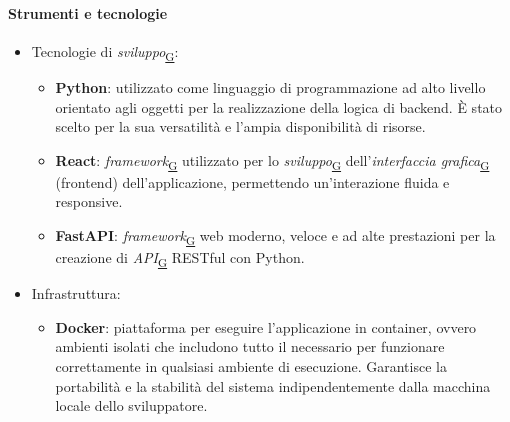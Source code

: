 \documentclass[a4paper,12pt]{article}
\begin{document}
{{{            \paragraph{Strumenti e tecnologie}\hfill{
                \begin{itemize}
                    \item Tecnologie di \textit{sviluppo}\textsubscript{\href{https://atlasteam9.github.io/Atlas/glossario.html\#Sviluppo}{G}}:
                    \begin{itemize}
                        \item \textbf{Python}: utilizzato come linguaggio di programmazione ad alto livello orientato agli oggetti per la realizzazione della logica di backend. È stato scelto per la sua versatilità e l'ampia disponibilità di risorse.
                        \item \textbf{React}: \textit{framework}\textsubscript{\href{https://atlasteam9.github.io/Atlas/glossario.html\#Framework}{G}} utilizzato per lo \textit{sviluppo}\textsubscript{\href{https://atlasteam9.github.io/Atlas/glossario.html\#Sviluppo}{G}} dell'\textit{interfaccia grafica}\textsubscript{\href{https://atlasteam9.github.io/Atlas/glossario.html\#Interfacciagrafica}{G}} (frontend) dell'applicazione, permettendo un'interazione fluida e responsive.
                        \item \textbf{FastAPI}: \textit{framework}\textsubscript{\href{https://atlasteam9.github.io/Atlas/glossario.html\#Framework}{G}} web moderno, veloce e ad alte prestazioni per la creazione di \textit{API}\textsubscript{\href{https://atlasteam9.github.io/Atlas/glossario.html\#API}{G}} RESTful con Python.
                    \end{itemize}

                    \item Infrastruttura:
                        \begin{itemize}
                            \item \textbf{Docker}: piattaforma per eseguire l'applicazione in container, ovvero ambienti isolati che includono tutto il necessario per funzionare correttamente in qualsiasi ambiente di esecuzione. Garantisce la portabilità e la stabilità del sistema indipendentemente dalla macchina locale dello sviluppatore.
                        \end{itemize}
                        

\end{itemize}}}}}
\end{document}
